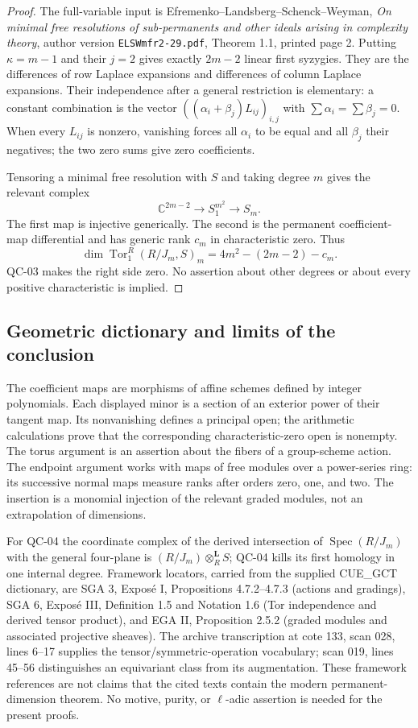 \begin{proof}
The full-variable input is Efremenko--Landsberg--Schenck--Weyman,
\emph{On minimal free resolutions of sub-permanents and other ideals
arising in complexity theory}, author version
\texttt{ELSWmfr2-29.pdf}, Theorem 1.1, printed page 2.
Putting $\kappa=m-1$ and their $j=2$ gives exactly $2m-2$
linear first syzygies. They are the differences of row Laplace
expansions and differences of column Laplace expansions.
Their independence after a general restriction is elementary:
a constant combination is the vector
$((\alpha_i+\beta_j)L_{ij})_{i,j}$ with
$\sum\alpha_i=\sum\beta_j=0$. When every $L_{ij}$ is nonzero,
vanishing forces all $\alpha_i$ to be equal and all $\beta_j$
their negatives; the two zero sums give zero coefficients.

Tensoring a minimal free resolution with $S$ and taking degree
$m$ gives the relevant complex
\[
 \mathbb C^{2m-2}\longrightarrow S_1^{m^2}
                    \longrightarrow S_m.
\]
The first map is injective generically. The second is the
permanent coefficient-map differential and has generic rank $c_m$
in characteristic zero. Thus
\[
 \dim\operatorname{Tor}_1^R(R/J_m,S)_m
       =4m^2-(2m-2)-c_m.
\]
QC-03 makes the right side zero. No assertion about other degrees
or about every positive characteristic is implied.
\end{proof}

\subsection{Geometric dictionary and limits of the conclusion}

The coefficient maps are morphisms of affine schemes defined by
integer polynomials. Each displayed minor is a section of an
exterior power of their tangent map. Its nonvanishing defines a
principal open; the arithmetic calculations prove that the
corresponding characteristic-zero open is nonempty. The torus
argument is an assertion about the fibers of a group-scheme action.
The endpoint argument works with maps of free modules over a
power-series ring: its successive normal maps measure ranks after
orders zero, one, and two. The insertion is a monomial injection
of the relevant graded modules, not an extrapolation of dimensions.

For QC-04 the coordinate complex of the derived intersection of
$\operatorname{Spec}(R/J_m)$ with the general four-plane is
$(R/J_m)\otimes_R^{\mathbf L}S$; QC-04 kills its first homology
in one internal degree. Framework locators, carried from the
supplied CUE\_GCT dictionary, are SGA 3, Expos\'e I,
Propositions 4.7.2--4.7.3 (actions and gradings), SGA 6,
Expos\'e III, Definition 1.5 and Notation 1.6 (Tor independence
and derived tensor product), and EGA II, Proposition 2.5.2
(graded modules and associated projective sheaves). The archive
transcription at cote 133, scan 028, lines 6--17 supplies the
tensor/symmetric-operation vocabulary; scan 019, lines 45--56
distinguishes an equivariant class from its augmentation. These
framework references are not claims that the cited texts contain
the modern permanent-dimension theorem. No motive, purity, or
$\ell$-adic assertion is needed for the present proofs.


